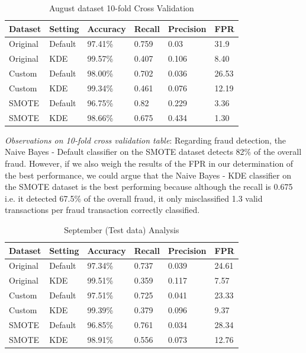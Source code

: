 \documentclass[conference]{IEEEtran}
\begin{document}
\begin{table}[h]
\caption{August dataset 10-fold Cross Validation}
\begin{center}
\begin{tabular}{ | l | l | l | l | l | l |}
\hline
Dataset & Setting & Accuracy & Recall & Precision & FPR \\ [0.5ex]
\hline\hline
Original & Default & 97.41\% & 0.759 & 0.03 & 31.9\\
\hline
Original & KDE & 99.57\% & 0.407 & 0.106 & 8.40\\
\hline
Custom & Default & 98.00\% & 0.702 & 0.036 & 26.53\\
\hline
Custom & KDE & 99.34\% & 0.461 & 0.076 & 12.19\\
\hline
SMOTE & Default & 96.75\% & 0.82 & 0.229 & 3.36\\
\hline
SMOTE & KDE & 98.66\% & 0.675 & 0.434 & 1.30\\ [1ex]
\hline
\end{tabular}
\end{center}
\end{table}

\textit{Observations on 10-fold cross validation table}: Regarding fraud detection, the Naive Bayes - Default classifier on the SMOTE dataset detects 82\% of the overall fraud. However, if we also weigh the results of the FPR in our determination of the best performance, we could argue that the Naive Bayes - KDE classifier on the SMOTE dataset is the best performing because although the recall is 0.675 i.e. it detected 67.5\% of the overall fraud, it only misclassified 1.3 valid transactions per fraud transaction correctly classified.


\begin{table}[h]
\caption{September (Test data) Analysis}
\begin{center}
\begin{tabular}{ | l | l | l | l | l | l |}
\hline
Dataset & Setting & Accuracy & Recall & Precision & FPR \\ [0.5ex]
\hline\hline
Original & Default & 97.34\% & 0.737 & 0.039 & 24.61\\
\hline
Original & KDE & 99.51\% & 0.359 & 0.117 & 7.57\\
\hline
Custom & Default & 97.51\% & 0.725 & 0.041 & 23.33\\
\hline
Custom & KDE & 99.39\% & 0.379 & 0.096 & 9.37\\
\hline
SMOTE & Default & 96.85\% & 0.761 & 0.034 & 28.34\\
\hline
SMOTE & KDE & 98.91\% & 0.556 & 0.073 & 12.76\\ [1ex]
\hline
\end{tabular}
\end{center}
\end{table}
\end{document}
